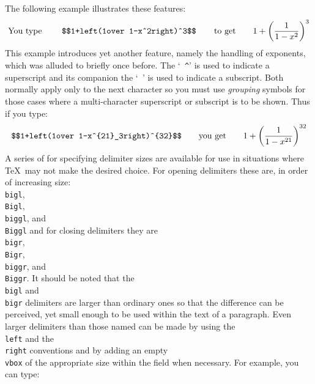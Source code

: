 The following example illustrates these features:
$$\hbox{You type \qquad
{\tt \$\$1+\\left(1\\over 1-x{}\^{}2\\right)\^{}3\$\$\qquad}to get}\qquad
1+\left(1\over1-x^2\right)^3$$
This example introduces yet another feature, namely the handling of
exponents, which was alluded to briefly once before.
The `{\tt
\^{}}' is used to indicate a superscript and its companion the `{\tt
\und}' is used to indicate a subscript. Both normally apply only to the
next character so you must use {\sl grouping\/} symbols for those cases
where a multi-character superscript or subscript is to be shown. Thus if
you type:
$$\hbox
{{\tt \$\$1+\\left(1\\over 
1-x\^{}\lbr 21\rbr\und{}3\\right)\^{}\lbr 32\rbr\$\$}\qquad
you get}\qquad 1+\left(1\over1-x^{21}\right)^{32}$$ 
A series of \css\/ for specifying delimiter sizes are available
for use in situations where \TeX\ may not make the desired choice.
For opening delimiters these are, in order of increasing
size:  {\tt \\bigl}, {\tt \\Bigl}, {\tt \\biggl}, and {\tt \\Biggl} and
for closing delimiters they are {\tt \\bigr}, {\tt \\Bigr}, {\tt \\biggr},
and {\tt \\Biggr}. It should be noted that the {\tt \\bigl} and {\tt
\\bigr} delimiters are larger than ordinary ones so that the
difference can be perceived, yet small enough to be used within the text of a
paragraph.  Even larger delimiters than those named can be made by
using the {\tt \\left} and the {\tt \\right} conventions and by adding an
empty {\tt \\vbox} of the appropriate size within the field when
necessary. For example, you can type:
